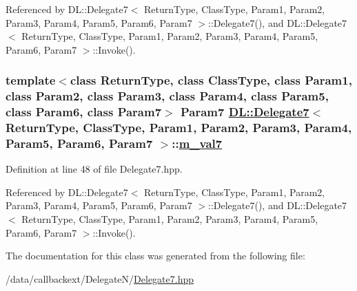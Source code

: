 Referenced by DL::Delegate7$<$ Return\-Type, Class\-Type, Param1, Param2, Param3, Param4, Param5, Param6, Param7 $>$::Delegate7(), and DL::Delegate7$<$ Return\-Type, Class\-Type, Param1, Param2, Param3, Param4, Param5, Param6, Param7 $>$::Invoke().\hypertarget{classDL_1_1Delegate7_r8}{
\subsubsection[m\_\-val7]{\setlength{\rightskip}{0pt plus 5cm}template$<$class Return\-Type, class Class\-Type, class Param1, class Param2, class Param3, class Param4, class Param5, class Param6, class Param7$>$ Param7 \hyperlink{classDL_1_1Delegate7}{DL::Delegate7}$<$ Return\-Type, Class\-Type, Param1, Param2, Param3, Param4, Param5, Param6, Param7 $>$::\hyperlink{classDL_1_1Delegate7_r8}{m\_\-val7}}}
\label{classDL_1_1Delegate7_r8}




Definition at line 48 of file Delegate7.hpp.

Referenced by DL::Delegate7$<$ Return\-Type, Class\-Type, Param1, Param2, Param3, Param4, Param5, Param6, Param7 $>$::Delegate7(), and DL::Delegate7$<$ Return\-Type, Class\-Type, Param1, Param2, Param3, Param4, Param5, Param6, Param7 $>$::Invoke().

The documentation for this class was generated from the following file:\begin{CompactItemize}
\item 
/data/callbackext/Delegate\-N/\hyperlink{Delegate7_8hpp}{Delegate7.hpp}\end{CompactItemize}
